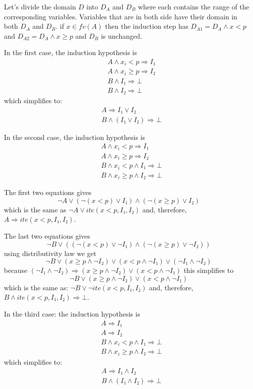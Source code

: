Let's divide the domain $D$ into $D_A$ and $D_B$ where each contains the range of the corresponding variables.
Variables that are in both side have their domain in both $D_A$ and $D_B$. 
if $x\in fv(A)$ then the induction step has $D_{A1} = D_A ∧ x < p$ and $D_{A2} = D_A ∧ x ≥ p$ and $D_B$ is unchanged.

In the first case, the induction hypothesis is
\begin{eqnarray*}
& A ∧ x_i < p ⇒ I₁ \\
& A ∧ x_i ≥ p ⇒ I₂ \\
& B ∧ I₁ ⇒ ⊥ \\
& B ∧ I₂ ⇒ ⊥
\end{eqnarray*}
which simplifies to:
\begin{eqnarray*}
& A ⇒ I₁ ∨ I₂ \\
& B ∧ (I₁ ∨ I₂) ⇒ ⊥
\end{eqnarray*}

In the second case, the induction hypothesis is
\begin{eqnarray*}
& A ∧ x_i < p ⇒ I₁ \\
& A ∧ x_i ≥ p ⇒ I₂ \\
& B ∧ x_i < p ∧ I₁ ⇒ ⊥ \\
& B ∧ x_i ≥ p ∧ I₂ ⇒ ⊥
\end{eqnarray*}

The first two equations gives
\[
    ¬ A ∨ (¬(x < p) ∨ I₁) ∧ (¬(x ≥ p) ∨ I₂)
\]
which is the same as $¬ A ∨ ite(x < p, I₁, I₂)$
and, therefore, $A ⇒ ite(x < p, I₁, I₂)$.

The last two equations gives
\[
    ¬ B ∨ ((¬(x < p) ∨ ¬ I₁) ∧ (¬(x ≥ p) ∨ ¬ I₂))
\]
using distributivity law we get
\[
    ¬ B ∨ (x ≥ p ∧ ¬ I₂) ∨ (x < p ∧ ¬ I₁) ∨ (¬ I₁ ∧ ¬ I₂)
\]
because $(¬ I₁ ∧ ¬ I₂) ⇒  (x ≥ p ∧ ¬ I₂) ∨ (x < p ∧ ¬ I₁)$
this simplifies to
\[
 ¬ B ∨ (x ≥ p ∧ ¬ I₂) ∨ (x < p ∧ ¬ I₁)
\]
which is the same as: $¬ B ∨ ¬ ite(x < p, I₁, I₂)$
and, therefore, $B ∧ ite(x < p, I₁, I₂) ⇒ ⊥$.

In the third case: the induction hypothesis is
\begin{eqnarray*}
& A ⇒ I₁ \\
& A ⇒ I₂ \\
& B ∧ x_i < p ∧ I₁ ⇒ ⊥ \\
& B ∧ x_i ≥ p ∧ I₂ ⇒ ⊥
\end{eqnarray*}
which simplifies to:
\begin{eqnarray*}
& A ⇒ I₁ ∧ I₂ \\
& B ∧ (I₁ ∧ I₂) ⇒ ⊥
\end{eqnarray*}

